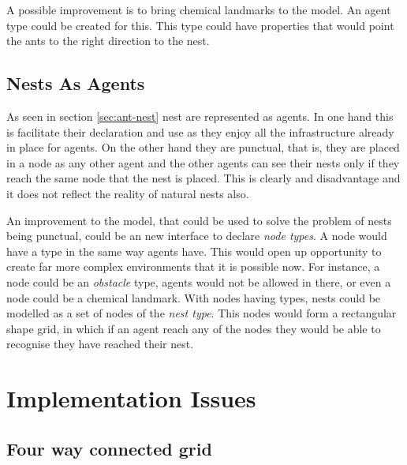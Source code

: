 A possible improvement is to bring chemical landmarks to the model. An agent type could be created for this. This type could have properties that would point the ants to the right direction to the nest.

\subsection{Nests As Agents}

As seen in section \ref{sec:ant-nest} nest are represented as agents. In one hand this is facilitate their declaration and use as they enjoy all the infrastructure already in place for agents. On the other hand they are punctual, that is, they are placed in a node as any other agent and the other agents can see their nests only if they reach the same node that the nest is placed. This is clearly and disadvantage and it does not reflect the reality of natural nests also.

An improvement to the model, that could be used to solve the problem of nests being punctual, could be an new interface to declare \emph{node types}. A node would have a type in the same way agents have. This would open up opportunity to create far more complex environments that it is possible now. For instance, a node could be an  \emph{obstacle} type, agents would not be allowed in there, or even a node could be a chemical landmark. With nodes having types, nests could be modelled as a set of nodes of the \emph{nest type}. This nodes would form a rectangular shape grid, in which if an agent reach any of the nodes they would be able to recognise they have reached their nest.



\section{Implementation Issues}
\subsection{Four way connected grid}
